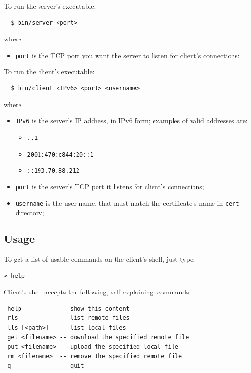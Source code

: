 \documentclass[a4paper,12pt]{article}
\begin{document}
To run the server's executable:
\begin{verbatim}
  $ bin/server <port>
\end{verbatim}
where
\begin{itemize}
  \item \texttt{port} is the TCP port you want the server to listen for client's connections;
\end{itemize}

To run the client's executable:
\begin{verbatim}
  $ bin/client <IPv6> <port> <username>
\end{verbatim}
where
\begin{itemize}
  \item \texttt{IPv6} is the server's IP address, in IPv6 form; examples of valid addresses are:
  \begin{itemize}
    \item \texttt{::1}
    \item \texttt{2001:470:c844:20::1}
    \item \texttt{::193.70.88.212}
  \end{itemize}
  \item \texttt{port} is the server's TCP port it listens for client's connections;
  \item \texttt{username} is the user name, that must match the certificate's name in \texttt{cert} directory;
\end{itemize}

\subsection{Usage}
To get a list of usable commands on the client's shell, just type:
\begin{verbatim}
> help
\end{verbatim}

Client's shell accepts the following, self explaining, commands:
\begin{verbatim}
 help           -- show this content
 rls            -- list remote files
 lls [<path>]   -- list local files
 get <filename> -- download the specified remote file
 put <filename> -- upload the specified local file
 rm <filename>  -- remove the specified remote file
 q              -- quit
\end{verbatim}
\end{document}
